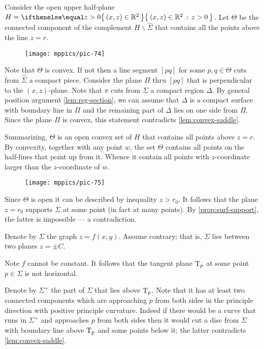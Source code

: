 Consider the open upper half-plane $H=\set{(x,z)\in \RR^2}{z> 0}$. 
Let $\Theta$ be the connected component of the complement $H\backslash \hat \Sigma$ that contains all the points above the line $z=r$.

\begin{figure}[h!]
\vskip-0mm
\centering
\texttt{[image: mppics/pic-74]}
\vskip0mm
\end{figure}

Note that $\Theta$ is convex.
If not then a line segment $[pq]$ for some $p,q\in \Theta$ cuts from $\hat\Sigma$ a compact piece.
Consider the plane $\Pi$ thru $[pq]$ that is perpendicular to the $(x,z)$-plane.
Note that $\pi$ cuts from $\Sigma$ a compact region $\Delta$.
By general position argument \ref{lem:reg-section}, 
we can assume that $\Delta$ is a compact surface with boundary line in $\Pi$ and the remaining part of $\Delta$ lies on one side from $\Pi$.
Since the plane $\Pi$ is convex, this statement contradicts \ref{lem:convex-saddle}.

Summarizing, $\Theta$ is an open convex set of $H$ that contains all points above $z=r$.
By convexity, together with any point $w$, the set $\Theta$ contains all points on the half-lines that point up from it. 
Whence it contain all points with $z$-coordinate larger than the $z$-coordinate of $w$.
\begin{figure}[h!]
\vskip-0mm
\centering
\texttt{[image: mppics/pic-75]}
\vskip0mm
\end{figure}
Since $\Theta$ is open it can be described by inequality $z>r_0$.
It follows that the plane $z=r_0$ supports $\Sigma$ at some point (in fact at many points).
By \ref{prop:surf-support}, the latter is impossible --- a contradiction.
\qeds

Denote by $\Sigma$ the graph $z=f(x,y)$.
Assume contrary; that is, $\Sigma$ lies between two planes $z=\pm C$.

Note $f$ cannot be constant.
It follows that the tangent plane $\mathrm{T}_p$ at some point $p\in\Sigma$ is not horizontal.

Denote by $\Sigma^+$ the part of $\Sigma$ that lies above $\mathrm{T}_p$.
Note that it has at least two connected components which are approaching $p$ from both sides 
in the principle direction with positive principle curvature.
Indeed if there would be a curve that runs in $\Sigma^+$ and approaches $p$ from both sides then it would cut a disc from $\Sigma$ with boundary line above $\mathrm{T}_p$ and some points below it;
the latter contradicts \ref{lem:convex-saddle}.

